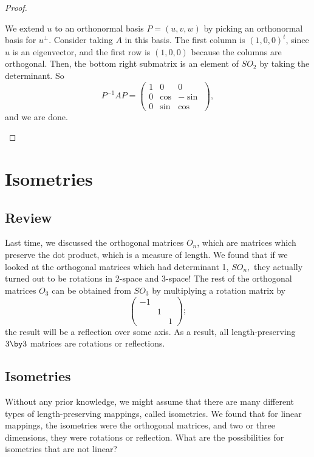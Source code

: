\begin{proof}
\begin{itemize}
    We extend $u$ to an orthonormal basis $P = (u, v, w)$ by picking an orthonormal basis for $u^\perp$. Consider taking $A$ in this basis. The first column is $(1, 0, 0)^t$, since $u$ is an eigenvector, and the first row is $(1, 0, 0)$ because the columns are orthogonal. Then, the bottom right submatrix is an element of $SO_2$ by taking the determinant. 
    So \[P^{-1} AP =
    \begin{pmatrix}
        1 & 0 & 0 \\
        0 & \cos & -\sin \\
        0 & \sin & \cos
    \end{pmatrix},
    \]
    and we are done.
\end{itemize}

\end{proof}

\newpage


\section{Isometries}
\subsection{Review}
Last time, we discussed the orthogonal matrices $O_n$, which are matrices which preserve the dot product, which is a measure of length. We found that if we looked at the orthogonal matrices which had determinant 1, $SO_n,$ they actually turned out to be rotations in 2-space and 3-space! The rest of the orthogonal matrices $O_3$ can be obtained from $SO_3$ by multiplying a rotation matrix by 
\[
\begin{pmatrix}
-1 & & \\
& 1 & \\
& & 1
\end{pmatrix};
\]
the result will be a reflection over some axis. As a result, all length-preserving $3 \by 3$ matrices are rotations or reflections. 

\subsection{Isometries}

Without any prior knowledge, we might assume that there are many different types of length-preserving mappings, called isometries. We found that for linear mappings, the isometries were the orthogonal matrices, and two or three dimensions, they were rotations or reflection. What are the possibilities for isometries that are not linear?

